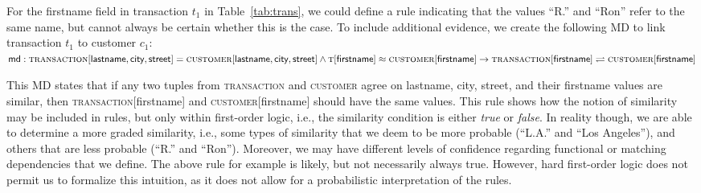 For the \textsf{firstname} field in transaction $t_1$ in Table~\ref{tab:trans}, we could define a rule indicating that the values ``R.'' and ``Ron'' refer to the same name, but cannot always be certain whether this is the case. To include additional evidence, we create the following MD to link transaction $t_1$ 
to customer $c_1$:\\ 
$ \textsf{md}: \textsc{transaction}[\textsf{lastname}, \textsf{city}, \textsf{street}]
= \textsc{customer}[\textsf{lastname}, \textsf{city}, \textsf{street}] \land \textsc{t}[\textsf{firstname}] \approx \textsc{customer}[\textsf{firstname}] 
 \rightarrow \textsc{transaction}[\textsf{firstname}] \rightleftharpoons \textsc{customer}[\textsf{firstname}]$


This MD states that if any two tuples from \textsc{transaction} and \textsc{customer} agree on \textsf{lastname}, \textsf{city}, \textsf{street}, and their \textsf{firstname} values are similar, then \textsc{transaction}[\textsf{firstname}] and \textsc{customer}[\textsf{firstname}] should have the same values. This rule shows how the notion of similarity may be included in rules, but only within first-order logic, i.e., the similarity condition is either \emph{true} or \emph{false}. In reality though, we are able to determine a more graded similarity, i.e., some types of similarity that we deem to be more probable (``L.A.'' and ``Los Angeles''), and others that are less probable (``R.'' and ``Ron''). Moreover, we may have different levels of confidence regarding functional or matching dependencies that we define. The above rule for example is likely, but not necessarily always true. However, hard first-order logic does not permit us to formalize this intuition, as it does not allow for a probabilistic interpretation of the rules.